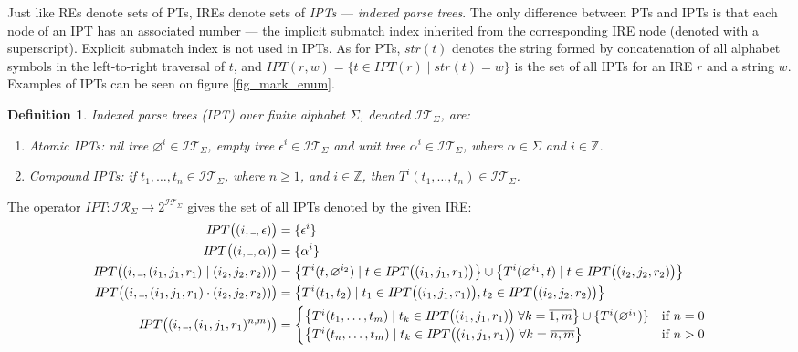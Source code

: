 \documentclass[AMA,STIX1COL]{WileyNJD-v2}
\newcommand{\Xund}{\rule{.4em}{.4pt}}
\newcommand{\XI}{\mathcal{I}}
\newcommand{\XIT}{\XI\!\XT}
\newcommand{\XIR}{\XI\!\XR}
\newcommand{\XR}{\mathcal{R}}
\newcommand{\XT}{\mathcal{T}}
\newcommand{\YZ}{\mathbb{Z}}
\newcommand{\IPT}{I\!PT}
\newtheorem{Xdef}{Definition}
\begin{document}
Just like REs denote sets of PTs, IREs denote sets of \emph{IPTs} --- \emph{indexed parse trees}.
The only difference between PTs and IPTs is that each node of an IPT has an associated number ---
the implicit submatch index inherited from the corresponding IRE node (denoted with a superscript).
Explicit submatch index is not used in IPTs.
%
As for PTs, $str(t)$ denotes the string formed by concatenation of all alphabet symbols in the left-to-right traversal of $t$,
and $\IPT(r, w) = \{ t \in \IPT(r) \mid str(t) = w \}$ is the set of all IPTs for an IRE $r$ and a string $w$.
%
Examples of IPTs can be seen on figure \ref{fig_mark_enum}.

\FloatBarrier

    \begin{Xdef}
    \emph{Indexed parse trees (IPT)} over finite alphabet $\Sigma$, denoted $\XIT_\Sigma$, are:
    \begin{enumerate}
        \item Atomic IPTs:
          \emph{nil tree} ${\varnothing}^i \in \XIT_\Sigma$,
          \emph{empty tree} ${\epsilon}^i \in \XIT_\Sigma$ and
          \emph{unit tree} ${\alpha}^i \in \XIT_\Sigma$, where $\alpha \in \Sigma$ and $i \in \YZ$.
        \item Compound IPTs: if $t_1, \dots, t_n \in \XIT_\Sigma$, where $n \geq 1$, and $i \in \YZ$, then
          ${T}^i(t_1, \dots, t_n) \in \XIT_\Sigma$.
    \end{enumerate}
    \end{Xdef}

The operator $\IPT: \XIR_\Sigma \rightarrow 2^{\XIT_\Sigma}$ gives the set of all IPTs denoted by the given IRE:
    \begin{align*}
        \IPT\big((i, \Xund, \epsilon)\big) &= \{ {\epsilon}^{i} \}
        \\
        \IPT\big((i, \Xund, \alpha)\big) &= \{ {\alpha}^{i} \}
        \\
        \IPT\big((i, \Xund, (i_1, j_1, r_1) \mid (i_2, j_2, r_2))\big) &=
            \big\{ {T}^{i}(t, \varnothing^{i_2}) \mid t \in \IPT\big((i_1, j_1, r_1)\big) \big\} \cup
            \big\{ {T}^{i}(\varnothing^{i_1}, t) \mid t \in \IPT\big((i_2, j_2, r_2)\big) \big\}
        \\
        \IPT\big((i, \Xund, (i_1, j_1, r_1) \cdot (i_2, j_2, r_2))\big) &=
            \big\{ {T}^{i}(t_1, t_2) \mid
                t_1 \in \IPT\big((i_1, j_1, r_1)\big),
                t_2 \in \IPT\big((i_2, j_2, r_2)\big)
            \big\} \\
        \IPT\big((i, \Xund, (i_1, j_1, r_1)^{n, m})\big) &=
            \begin{cases}
                \big\{ {T}^{i}(t_1, \dots, t_m) \mid t_k \in \IPT\big((i_1, j_1, r_1)\big) \;
                    \forall k = \overline{1, m} \big\} \cup \{ {T}^{i}(\varnothing^{i_1}) \} &\text{if } n = 0 \\
                \big\{ {T}^{i}(t_n, \dots, t_m) \mid t_k \in \IPT\big((i_1, j_1, r_1)\big) \;
                    \forall k = \overline{n, m} \big\} &\text{if } n > 0
            \end{cases}
    \end{align*}
\end{document}
